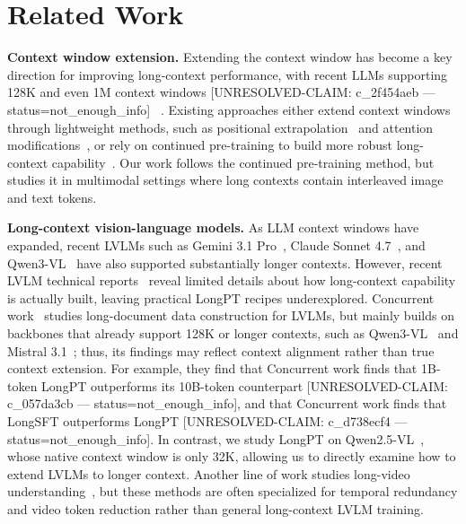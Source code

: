 \section{Related Work}
\label{sec:related}
\noindent\textbf{Context window extension.}
Extending the context window has become a key direction for improving long-context performance, with recent LLMs supporting 128K and even 1M context windows [UNRESOLVED-CLAIM: c_2f454aeb — status=not_enough_info] ~\citep{yang2025qwen3,hurst2024gpt,team2024gemini_1_5,google2024gemini_2,google2025gemini2_5}.
Existing approaches either extend context windows through lightweight methods, such as positional extrapolation~\citep{chen2023extending,pengyarn,ding2024longrope,zhang2024extending,zhu2023pose} and attention modifications~\citep{chen2023longlora,xiao2023efficient,xiao2024infllm,bertsch2023unlimiformer,jin2024llm}, or rely on continued pre-training to build more robust long-context capability~\citep{xiong2024effective,fu2024data,gao2025prolong,Yang2025Qwen251MTR}.
Our work follows the continued pre-training method, but studies it in multimodal settings where long contexts contain interleaved image and text tokens.

\noindent\textbf{Long-context vision-language models.}
As LLM context windows have expanded, recent LVLMs such as Gemini 3.1 Pro~\citep{gemini_3_1_pro_2026}, Claude Sonnet 4.7~\citep{anthropic2026introducing_claude_opus_4_7}, and Qwen3-VL~\citep{bai2025qwen3} have also supported substantially longer contexts.
However, recent LVLM technical reports~\citep{bai2025qwen3,hong2025glm} reveal limited details about how long-context capability is actually built, leaving practical LongPT recipes underexplored.
Concurrent work~\citep{veselka2026longvlm} studies long-document data construction for LVLMs, but mainly builds on backbones that already support 128K or longer contexts, such as Qwen3-VL~\citep{bai2025qwen3} and Mistral 3.1~\citep{mistralai2025mistral_small_3_1}; thus, its findings may reflect context alignment rather than true context extension.
For example, they find that Concurrent work finds that 1B-token LongPT outperforms its 10B-token counterpart [UNRESOLVED-CLAIM: c_057da3cb — status=not_enough_info], and that Concurrent work finds that LongSFT outperforms LongPT [UNRESOLVED-CLAIM: c_d738ecf4 — status=not_enough_info].
In contrast, we study LongPT on Qwen2.5-VL~\citep{bai2025qwen2}, whose native context window is only 32K, allowing us to directly examine how to extend LVLMs to longer context.
Another line of work studies long-video understanding~\citep{chen2024longvila,shen2025longvita,yang2025eea,zhang2024longva,yang2025longvt,liu2025bolt,shen2024longvu}, but these methods are often specialized for temporal redundancy and video token reduction rather than general long-context LVLM training.

